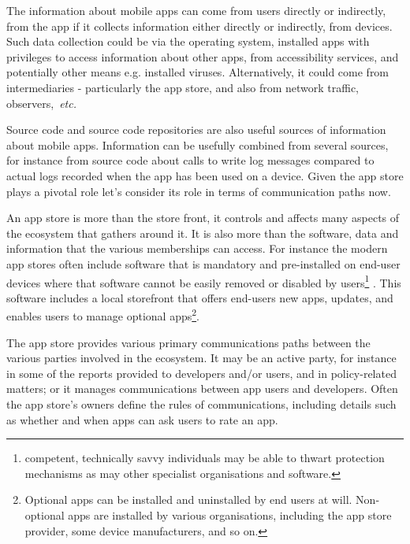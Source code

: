 The information about mobile apps can come from users directly or indirectly, from the app if it collects information either directly or indirectly, from devices. Such data collection could be via the operating system, installed apps with privileges to access information about other apps, from accessibility services, and potentially other means e.g. installed viruses. Alternatively, it could come from intermediaries - particularly the app store, and also from network traffic, observers,~\emph{etc.} 

Source code and source code repositories are also useful sources of information about mobile apps. Information can be usefully combined from several sources, for instance from source code about calls to write log messages compared to actual logs recorded when the app has been used on a device. Given the app store plays a pivotal role let's consider its role in terms of communication paths now. 

An app store is more than the store front, it controls and affects many aspects of the ecosystem that gathers around it. It is also more than the software, data and information that the various memberships can access. For instance the modern app stores often include software that is mandatory and pre-installed on end-user devices where that software cannot be easily removed or disabled by users\footnote{competent, technically savvy individuals may be able to thwart protection mechanisms as may other specialist organisations and software.} . This software includes a local storefront that offers end-users new apps, updates, and enables users to manage optional apps\footnote{Optional apps can be installed and uninstalled by end users at will. Non-optional apps are installed by various organisations, including the app store provider, some device manufacturers, and so on.}.

The app store provides various primary communications paths between the various parties involved in the ecosystem. It may be an active party, for instance in some of the reports provided to developers and/or users, and in policy-related matters; or it manages communications between app users and developers. Often the app store's owners define the rules of communications, including details such as whether and when apps can ask users to rate an app.

